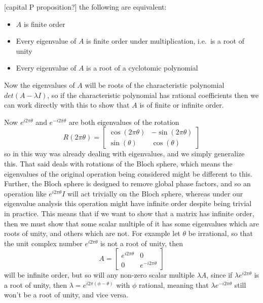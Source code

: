 [capital P proposition?] the following are equivalent:
\begin{itemize}
	\item $A$ is finite order
	\item Every eigenvalue of $A$ is finite order under multiplication, i.e.\ is a root of unity
	\item Every eigenvalue of $A$ is a root of a cyclotomic polynomial
\end{itemize}

Now the eigenvalues of $A$ will be roots of the characteristic polynomial $det(A - \lambda I)$, so if the characteristic polynomial has rational coefficients then we can work directly with this to show that $A$ is of finite or infinite order.

Now $e^{i 2\pi\theta}$ and $e^{-i 2\pi\theta}$ are both eigenvalues of the rotation
\[R(2\pi \theta) = \left[\begin{matrix}
\cos(2\pi\theta) & -\sin(2\pi\theta) \\
\sin(\theta) & \cos(\theta)
\end{matrix}\right]\]
so in this way \cite{universal-qubit} was already dealing with eigenvalues, and we simply generalize this. That said \cite{universal-qubit} deals with rotations of the Bloch sphere, which means the eigenvalues of the original operation being considered might be different to this. Further, the Bloch sphere is designed to remove global phase factors, and so an operation like $e^{i2\pi\theta}I$ will act trivially on the Bloch sphere, whereas under our eigenvalue analysis this operation might have infinite order despite being trivial in practice. This means that if we want to show that a matrix has infinite order, then we must show that some scalar multiple of it has some eigenvalues which are roots of unity, and others which are not. For example let $\theta$ be irrational, so that the unit complex number $e^{i2\pi\theta}$ is not a root of unity, then
\[A = \left[\begin{matrix}
e^{i2\pi\theta} & 0 \\
0 & e^{-i2\pi\theta}
\end{matrix}\right]\]
will be infinite order, but so will any non-zero scalar multiple $\lambda A$, since if $\lambda e^{i2\pi\theta}$ is a root of unity, then $\lambda = e^{i2\pi(\phi - \theta)}$ with $\phi$ rational, meaning that $\lambda e^{-i2\pi\theta}$ still won't be a root of unity, and vice versa.
